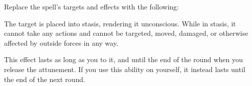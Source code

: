 


Replace the spell's targets and effects with the following:
\begin{spellcontent}

\begin{augmenttargetinginfo}



\end{augmenttargetinginfo}


\begin{augmenteffects}



\spelleffect
The target is placed into stasis, rendering it unconscious.
While in stasis, it cannot take any actions and cannot be targeted, moved, damaged, or otherwise affected by outside forces in any way.

This effect lasts as long as you  to it, and until the end of the round when you release the attunement.
If you use this ability on yourself, it instead lasts until the end of the next round.








\end{augmenteffects}

\end{spellcontent}









